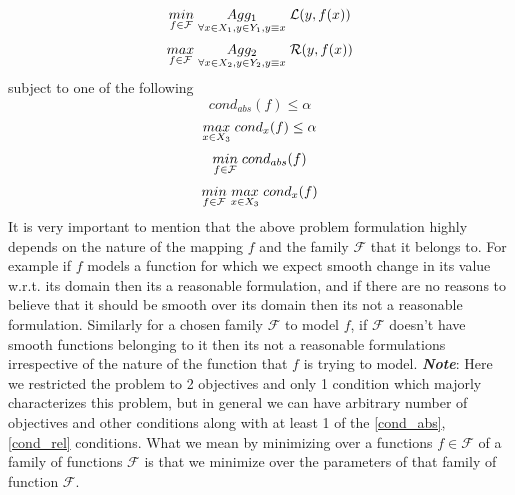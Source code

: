 \begin{equation} \label{opt_loss}
\underset{f\in \mathcal{F}}{min}\hspace{1mm} \underset{\forall x\in X_1, y \in Y_1, y \equiv x}{Agg_1} \hspace{1mm} \mathcal{L}(y,f(x))
\end{equation}
\begin{equation} \label{opt_reward}
\underset{f\in \mathcal{F}}{max}\hspace{1mm} \underset{\forall x\in X_2, y \in Y_2, y \equiv x}{Agg_2} \hspace{1mm} \mathcal{R}(y,f(x))
\end{equation}
subject to one of the following
\begin{equation} \label{cond_abs}
cond_{abs}(f) \le \alpha 
\end{equation}
\begin{equation} \label{cond_rel}
\underset{x \in X_3}{max}\hspace{1mm} cond_{x}(f) \le \alpha 
\end{equation}
\begin{equation} \label{cond_abs_min}
\underset{f\in \mathcal{F}}{min}\hspace{1mm}cond_{abs}(f)
\end{equation}
\begin{equation} \label{cond_rel_min}
\underset{f\in \mathcal{F}}{min}\hspace{1mm} \underset{x \in X_3}{max}\hspace{1mm}cond_{x}(f)
\end{equation}
\newline It is very important to mention that the above problem formulation highly depends on the nature of the mapping $f$ and the family $\mathcal{F}$ that it belongs to. For example if $f$ models a function for which we expect smooth change in its value w.r.t. its domain then its a reasonable formulation, and if there are no reasons to believe that it should be smooth over its domain then its not a reasonable formulation. Similarly for a chosen family $\mathcal{F}$ to model $f$, if $\mathcal{F}$ doesn't have smooth functions belonging to it then its not a reasonable formulations irrespective of the nature of the function that $f$ is trying to model.
\newline\newline
\textbf{\textit{Note}}: Here we restricted the problem to 2 objectives and only 1 condition which majorly characterizes this problem, but in general we can have arbitrary number of objectives and other conditions along with at least 1 of the \ref{cond_abs}, \ref{cond_rel} conditions.\newline
What we mean by minimizing over a functions $f \in \mathcal{F}$ of a family of functions $\mathcal{F}$ is that we minimize over the parameters of that family of function $\mathcal{F}$.

